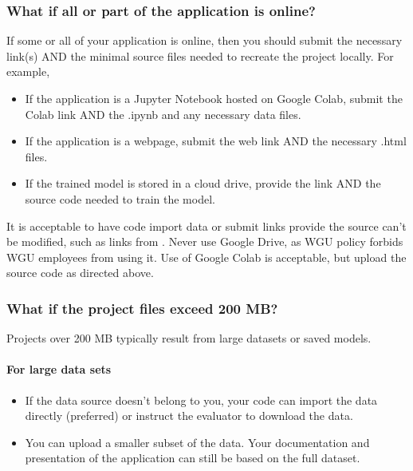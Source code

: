 \documentclass[letterpaper,10pt,english]{jupyterBook}
\begin{document}
\subsubsection{What if all or part of the application is online?}
\label{\detokenize{task2_doc/task2_doc_finish:what-if-all-or-part-of-the-application-is-online}}
\sphinxAtStartPar
If some or all of your application is online, then you should submit the necessary link(s) AND the minimal source files needed to recreate the project locally. For example,
\begin{itemize}
\item {} 
\sphinxAtStartPar
If the application is a Jupyter Notebook hosted on Google Colab, submit the Colab link AND the .ipynb and any necessary data files.

\item {} 
\sphinxAtStartPar
If the application is a webpage, submit the web link AND the necessary .html files.

\item {} 
\sphinxAtStartPar
If the trained model is stored in a cloud drive, provide the link AND the source code needed to train the model.

\end{itemize}

\sphinxAtStartPar
It is acceptable to have code import data or submit links provide the source can’t be modified, such as links from . Never use Google Drive, as WGU policy forbids WGU employees from using it. Use of Google Colab is acceptable, but upload the source code as directed above.


\subsubsection{What if the project files exceed 200 MB?}
\label{\detokenize{task2_doc/task2_doc_finish:what-if-the-project-files-exceed-200-mb}}
\sphinxAtStartPar
Projects over 200 MB typically result from large datasets or saved models.


\paragraph{For large data sets}
\label{\detokenize{task2_doc/task2_doc_finish:for-large-data-sets}}\begin{itemize}
\item {} 
\sphinxAtStartPar
If the data source doesn’t belong to you, your code can import the data directly (preferred) or instruct the evaluator to download the data.

\item {} 
\sphinxAtStartPar
You can upload a smaller subset of the data. Your documentation and presentation of the application can still be based on the full dataset.

\end{itemize}
\end{document}
